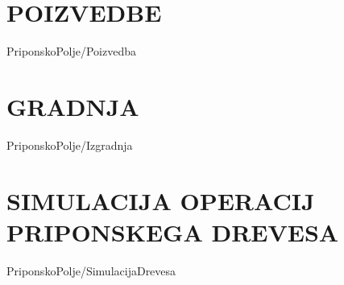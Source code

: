 
\section{POIZVEDBE}\label{sec:SAPoizvedbe}
{PriponskoPolje/Poizvedba}


\section{GRADNJA}\label{sec:SAIzgradnja}
{PriponskoPolje/Izgradnja}

\section{SIMULACIJA OPERACIJ PRIPONSKEGA DREVESA}\label{sec:STsimulacija}
{PriponskoPolje/SimulacijaDrevesa}